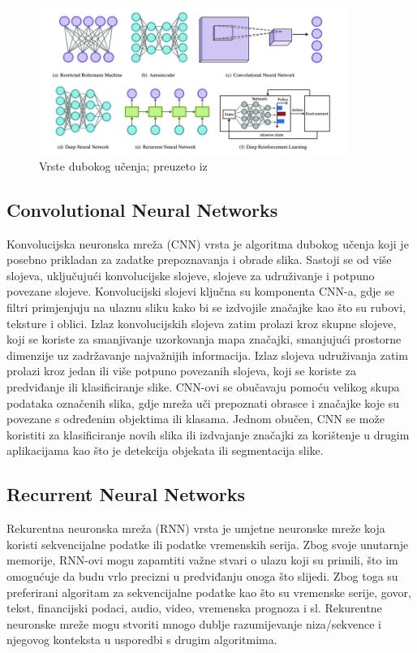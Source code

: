 \documentclass[]{foi}
\begin{document}
\begin{figure}[!h]
    \centering
    \includegraphics[width=0.9\textwidth]{slike/deep.jpg}
    \caption{Vrste dubokog učenja; preuzeto iz \cite{Deep}}
    \label{fig:deep-graf}
\end{figure}

\subsection{Convolutional Neural Networks}
Konvolucijska neuronska mreža (CNN) vrsta je algoritma dubokog učenja koji je posebno prikladan za zadatke prepoznavanja i obrade slika. Sastoji se od više slojeva, uključujući konvolucijske slojeve, slojeve za udruživanje i potpuno povezane slojeve. 
Konvolucijski slojevi ključna su komponenta CNN-a, gdje se filtri primjenjuju na ulaznu sliku kako bi se izdvojile značajke kao što su rubovi, teksture i oblici. Izlaz konvolucijskih slojeva zatim prolazi kroz skupne slojeve, koji se koriste za smanjivanje uzorkovanja mapa značajki, smanjujući prostorne dimenzije uz zadržavanje najvažnijih informacija. Izlaz slojeva udruživanja zatim prolazi kroz jedan ili više potpuno povezanih slojeva, koji se koriste za predviđanje ili klasificiranje slike. 
CNN-ovi se obučavaju pomoću velikog skupa podataka označenih slika, gdje mreža uči prepoznati obrasce i značajke koje su povezane s određenim objektima ili klasama. Jednom obučen, CNN se može koristiti za klasificiranje novih slika ili izdvajanje značajki za korištenje u drugim aplikacijama kao što je detekcija objekata ili segmentacija slike. \cite{GeeksforGeeks2020}

\subsection{Recurrent Neural Networks}
Rekurentna neuronska mreža (RNN) vrsta je umjetne neuronske mreže koja koristi sekvencijalne podatke ili podatke vremenskih serija. Zbog svoje unutarnje memorije, RNN-ovi mogu zapamtiti važne stvari o ulazu koji su primili, što im omogućuje da budu vrlo precizni u predviđanju onoga što slijedi. Zbog toga su preferirani algoritam za sekvencijalne podatke kao što su vremenske serije, govor, tekst, financijski podaci, audio, video, vremenska prognoza i sl. Rekurentne neuronske mreže mogu stvoriti mnogo dublje razumijevanje niza/sekvence i njegovog konteksta u usporedbi s drugim algoritmima. \cite{Donges}
\end{document}
